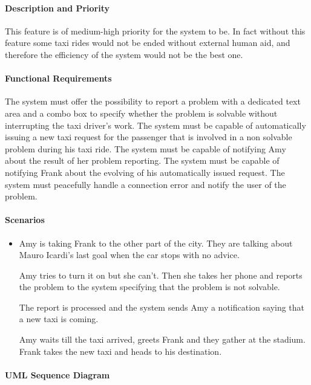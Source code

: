 \paragraph{Description and Priority}
This feature is of medium-high priority for the system to be. In fact without this feature some taxi rides would not be ended without external human aid, and therefore the efficiency of the system would not be the best one.
\paragraph{Functional Requirements}
\begin{itemize}
	 The system must offer the possibility to report a problem with a dedicated text area and a combo box to specify whether the problem is solvable without interrupting the taxi driver's work.
	 The system must be capable of automatically issuing a new taxi request for the passenger that is involved in a non solvable problem during his taxi ride.
	 The system must be capable of notifying Amy about the result of her problem reporting.
	 The system must be capable of notifying Frank about the evolving of his automatically issued request.
	 The system must peacefully handle a connection error and notify the user of the problem.
\end{itemize} 
\paragraph{Scenarios}
\begin{itemize}
	\item Amy is taking Frank to the other part of the city. They are talking about Mauro Icardi's last goal when the car stops with no advice. \par Amy tries to turn it on but she can't. Then she takes her phone and reports the problem to the system specifying that the problem is not solvable. \par The report is processed and the system sends Amy a notification saying that a new taxi is coming. \par Amy waits till the taxi arrived, greets Frank and they gather at the stadium. Frank takes the new taxi and heads to his destination.
\end{itemize}
\paragraph{UML Sequence Diagram}
